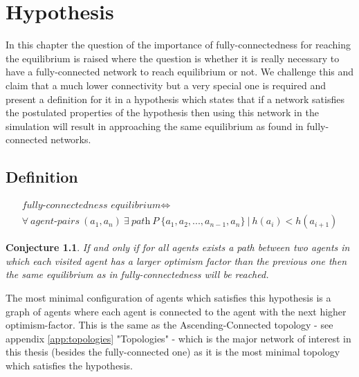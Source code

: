 \documentclass[Bachelorarbeit.tex]{subfiles}
\begin{document}
\graphicspath{{./figures/hypothesis/}}	%

\chapter{Hypothesis}
\label{ch:hypothesis}

In this chapter the question of the importance of fully-connectedness for reaching the equilibrium is raised where the question is whether it is really necessary to have a fully-connected network to reach equilibrium or not. We challenge this and claim that a much lower connectivity but a very special one is required and present a definition for it in a hypothesis which states that if a network satisfies the postulated properties of the hypothesis then using this network in the simulation will result in approaching the same equilibrium as found in fully-connected networks.

\section{Definition}

\begin{equation}
\begin{split}
\textit{fully-connectedness equilibrium} \iff \\
\forall \: \textit{agent-pairs} \: (a_{1},a_{n}) \: \exists \:  \textit{path} \: P \: \{a_{1}, a_{2}, ... , a_{n-1}, a_{n}\} \: | \: h(a_{i}) < h(a_{i+1})
\end{split}
\end{equation}

\newtheorem{conj}{Conjecture}

\begin{conj}
If and only if for all agents exists a path between two agents in which each visited agent has a larger optimism factor than the previous one then the same equilibrium as in fully-connectedness will be reached.
\end{conj}

The most minimal configuration of agents which satisfies this hypothesis is a graph of agents where each agent is connected to the agent with the next higher optimism-factor. This is the same as the Ascending-Connected topology - see appendix \ref{app:topologies} "Topologies" - which is the major network of interest in this thesis (besides the fully-connected one) as it is the most minimal topology which satisfies the hypothesis.
\end{document}
